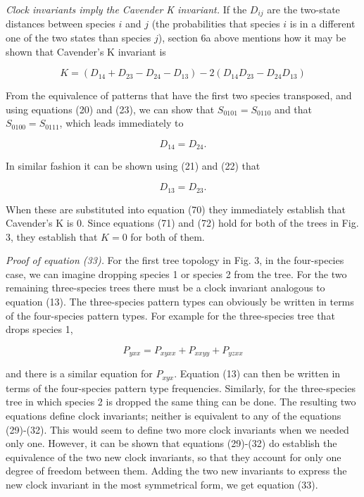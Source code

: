 {\it Clock invariants imply the Cavender K invariant.}  If the $D_{ij}$
are the two-state distances between species $i$ and $j$ (the probabilities
that species $i$ is in a different one of the two states than species $j$), 
section 6a above mentions how it may be shown that Cavender's K invariant is

\begin{equation} %
K  =  (D_{14} + D_{23} - D_{24} - D_{13}) - 2 (D_{14} D_{23} - D_{24} D_{13})
\end{equation}

From the equivalence of patterns that have the first two species transposed,
and using equations (20) and (23), we can show that $S_{0101} = S_{0110}$
and that $S_{0100} = S_{0111}$, which leads immediately to

\begin{equation} %
   D_{14} = D_{24}.
\end{equation}

In similar fashion it can be shown using (21) and (22) that

\begin{equation} %
   D_{13} = D_{23}.
\end{equation}

When these are substituted into equation (70) they immediately establish that
Cavender's K is 0.  Since equations (71) and (72) hold for both of the trees
in Fig. 3, they establish that $K = 0$ for both of them.

{\it Proof of equation (33).}  For the first tree topology in Fig. 3,
in the four-species case, we can imagine dropping species 1 or species 2
from the tree. For the two remaining three-species trees there must be
a clock invariant analogous to equation (13).  The three-species pattern
types can obviously be written in terms of the four-species pattern types.  For
example for the three-species tree that drops species 1,

\begin{equation} %
   P_{yxx} = P_{xyxx} + P_{xxyy} + P_{yzxx}
\end{equation}

and there is a similar equation for $P_{xyx}$.  Equation (13) can then be
written in terms of the four-species pattern type frequencies.  Similarly,
for the three-species tree in which species 2 is dropped the same thing
can be done.  The resulting two equations define clock invariants; neither
is equivalent to any of the equations (29)-(32).  This would seem to define
two more clock invariants when we needed only one.  However, it can be
shown that equations (29)-(32) do establish the equivalence of the two
new clock invariants, so that they account for only one degree of freedom
between them.  Adding the two new invariants to express the new clock
invariant in the most symmetrical form, we get equation (33).



